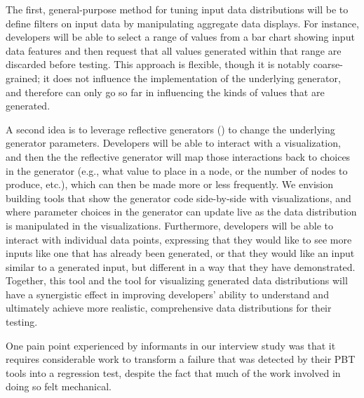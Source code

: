The first, general-purpose method for tuning input data distributions will be to
define filters on input data by manipulating aggregate data displays.
For instance, developers will be able to select a range of values from a bar
chart showing input data features and then request that all values generated
within that range are discarded before testing. This approach is flexible,
though it is notably coarse-grained;
it does not influence the implementation of the underlying generator, and
therefore can only go so far in influencing the kinds of values that are
generated.

A second idea is to leverage
reflective generators () to change the underlying
generator parameters. Developers will be able to interact with a visualization,
and then the the reflective generator will map those interactions
back to choices
in the generator (e.g., what value to place in a node, or the number of nodes to
produce, etc.), which can then be made more or less frequently. We envision
building tools that show the generator code
side-by-side with visualizations, and where parameter choices in the generator
can update live as the data distribution is manipulated in the visualizations.
Furthermore, developers will be able to interact with individual data points,
expressing that they would like to see more inputs like one that has already
been generated, or that they would like an input similar to a generated input,
but different in a way that they have demonstrated. Together, this tool and the
tool for visualizing generated data distributions will have a synergistic effect
in improving developers' ability to understand and ultimately achieve more
realistic, comprehensive data distributions for their testing.

%
One pain
point experienced
by informants in our interview study was that it requires considerable work to
transform a failure that was detected by their PBT tools into a
regression test, despite the fact that much of the work involved in doing so
felt mechanical.


